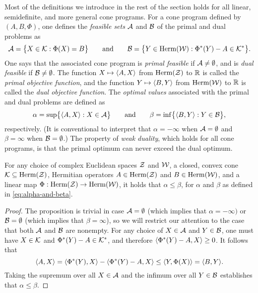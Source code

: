 Most of the definitions we introduce in the rest of the section holds for all linear, 
semidefinite, and more general cone programs.
For a cone program defined by $(A,B,\Phi)$, one defines the 
\emph{feasible sets} $\mathcal{A}$ and $\mathcal{B}$ of the primal and dual problems as
\begin{equation}
  \mathcal{A} = \bigl\{ X \in \mathcal{K} : \Phi(X) = B\bigr\} 
  \qquad \text{and} \qquad 
  \mathcal{B} = \bigl\{ Y \in \mathrm{Herm}(\mathcal{W}) : \Phi^{\ast}(Y) - A \in \mathcal{K}^{\ast} \bigr\}.
\end{equation}
One says that the associated cone program is \emph{primal feasible} if 
$\mathcal{A} \neq \emptyset$, and is \emph{dual feasible} if $\mathcal{B} \neq \emptyset$. 
The function $X \mapsto \langle A , X\rangle$ from $\mathrm{Herm}(\mathcal{Z})$ to $\mathbb{R}$ is called the 
\emph{primal objective function}, and the function $Y \mapsto \langle B , Y\rangle$ from 
$\mathrm{Herm}(\mathcal{W})$ to $\mathbb{R}$ is called the \emph{dual objective function}.
The \emph{optimal values} associated with the primal and dual problems are
defined as
\begin{equation}
  \label{eq:alpha-and-beta}
  \alpha = \sup \bigl\{ \langle A , X\rangle : X \in \mathcal{A} \bigr\} 
  \qquad \text{and} \qquad 
  \beta = \inf \bigl\{ \langle B , Y\rangle : Y \in \mathcal{B} \bigr\},
\end{equation}
respectively.
(It is conventional to interpret that $\alpha = -\infty$ when $\mathcal{A} = \emptyset$
and $\beta = \infty$ when $\mathcal{B} = \emptyset$.)
The property of \emph{weak duality}, which holds for all cone programs, is
that the primal optimum can never exceed the dual optimum.

\begin{prop}
\label{prop:weak-duality-cone}
  For any choice of complex Euclidean spaces $\mathcal{Z}$ and $\mathcal{W}$, a closed, convex
  cone $\mathcal{K}\subseteq\mathrm{Herm}(\mathcal{Z})$, Hermitian operators $A\in\mathrm{Herm}(\mathcal{Z})$ and
  $B\in\mathrm{Herm}(\mathcal{W})$, and a linear map $\Phi:\mathrm{Herm}(\mathcal{Z})\rightarrow\mathrm{Herm}(\mathcal{W})$, it
  holds that $\alpha \leq \beta$, for $\alpha$ and $\beta$ as defined in
  \eqref{eq:alpha-and-beta}.
\end{prop}

\begin{proof}
The proposition is trivial in case $\mathcal{A} = \emptyset$ (which implies that 
$\alpha = -\infty)$ or $\mathcal{B} = \emptyset$ (which implies that $\beta = \infty$), 
so we will restrict our attention to the case that both $\mathcal{A}$ and $\mathcal{B}$ are 
nonempty. 
For any choice of $X \in \mathcal{A}$ and $Y \in \mathcal{B}$, one must have $X \in \mathcal{K}$ and
$\Phi^{\ast}(Y) - A \in \mathcal{K}^{\ast}$, and therefore
$\langle \Phi^{\ast}(Y) - A , X\rangle \geq 0$.
It follows that
\begin{equation}
  \langle A , X\rangle = \langle \Phi^{\ast}(Y) , X\rangle - \langle \Phi^{\ast}(Y) - A , X\rangle
  \leq \langle Y , \Phi(X)\rangle = \langle B , Y\rangle.
\end{equation}
Taking the supremum over all $X \in \mathcal{A}$ and the infimum over all 
$Y \in \mathcal{B}$ establishes that $\alpha \leq \beta$.
\end{proof}

